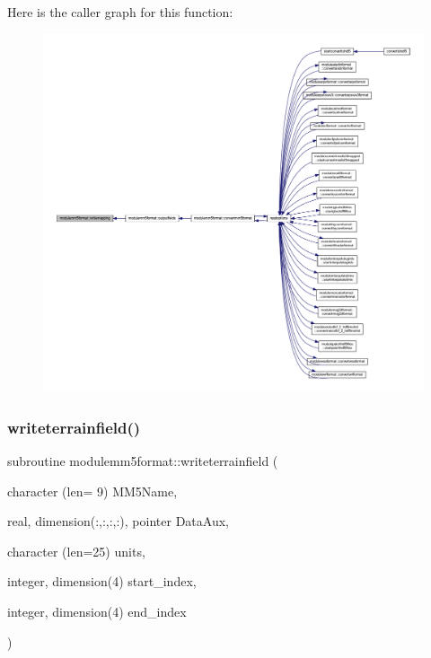Here is the caller graph for this function\+:\nopagebreak
\begin{figure}[H]
\begin{center}
\leavevmode
\includegraphics[width=350pt]{namespacemodulemm5format_ab8eb4353dbcd1d51f336675a6f66b0e6_icgraph}
\end{center}
\end{figure}
\mbox{\label{namespacemodulemm5format_a5e2ead0b671ea8295a54332e57b9f3c0}} 
\subsubsection{\texorpdfstring{writeterrainfield()}{writeterrainfield()}}
{\footnotesize\ttfamily subroutine modulemm5format\+::writeterrainfield (\begin{DoxyParamCaption}\item[{character (len= 9)}]{M\+M5\+Name,  }\item[{real, dimension(\+:,\+:,\+:,\+:), pointer}]{Data\+Aux,  }\item[{character (len=25)}]{units,  }\item[{integer, dimension(4)}]{start\+\_\+index,  }\item[{integer, dimension(4)}]{end\+\_\+index }\end{DoxyParamCaption})\hspace{0.3cm}{\ttfamily [private]}}

